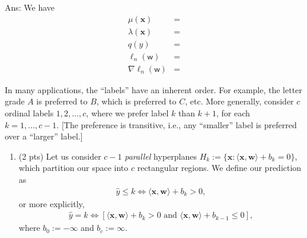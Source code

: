 \documentclass[10pt]{article}
\newcommand{\wv}{\mathbf{w}}
\newcommand{\xv}{\mathbf{x}}
\newcommand{\inner}[2]{\langle #1, #2 \rangle}
\newcommand{\wbs}{\bm{\mathsf{w}}}
\newcommand{\ie}{{i.e.}\xspace}
\newcommand{\etc}{{etc.}\xspace}
\newcommand{\ans}[1]{{\color{orange}\textsf{Ans}: #1}}
\begin{document}
\begin{exercise}
\begin{enumerate}
\ans{
We have 
\begin{align}
\mu(\xv) &=  \\
\lambda(\xv) &= \\
q(y) &= \\
\ell_n(\wbs) &= \\
\nabla\ell_n(\wbs) &=
\end{align}
}	
	
\end{enumerate}
\end{exercise}


\begin{exercise}
In many applications, the ``labels'' have an inherent order. For example, the letter grade $A$ is preferred to $B$, which is preferred to $C$, \etc More generally, consider $c$ ordinal labels $1, 2, \ldots, c$, where we prefer label $k$ than $k+1$, for each $k=1, \ldots, c-1$. [The preference is transitive, \ie, any ``smaller'' label is preferred over a ``larger'' label.]

\begin{enumerate}

\item (2 pts) Let us consider $c-1$ \emph{parallel} hyperplanes 
$H_k := \{\xv : \inner{\xv}{\wv} + b_k = 0 \}$, which partition our space into $c$ rectangular regions. We define our prediction as 
\begin{align}
\hat y \leq k \iff \inner{\xv}{\wv} + b_{k} > 0, 
\end{align}
or more explicitly, 
\begin{align}
\hat y = k \iff [\inner{\xv}{\wv} + b_{k} > 0 \mbox{ and } \inner{\xv}{\wv} + b_{k-1} \leq 0 ],
\end{align}
where $b_0 := -\infty$ and $b_c := \infty$.
	
\begin{center}
\end{center}
	

\end{enumerate}
\end{exercise}
\end{document}
